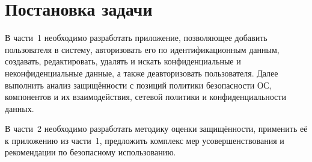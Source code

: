 \section{Постановка задачи}
\label{sec:task}

В части~1 необходимо разработать приложение, позволяющее добавить пользователя в систему, авторизовать его по идентификационным данным, создавать, редактировать, удалять и искать конфиденциальные и неконфиденциальные данные, а также деавторизовать пользователя. Далее выполнить анализ защищённости с позиций политики безопасности ОС, компонентов и их взаимодействия, сетевой политики и конфиденциальности данных.

В части~2 необходимо разработать методику оценки защищённости, применить её к приложению из части~1, предложить комплекс мер усовершенствования и рекомендации по безопасному использованию.
